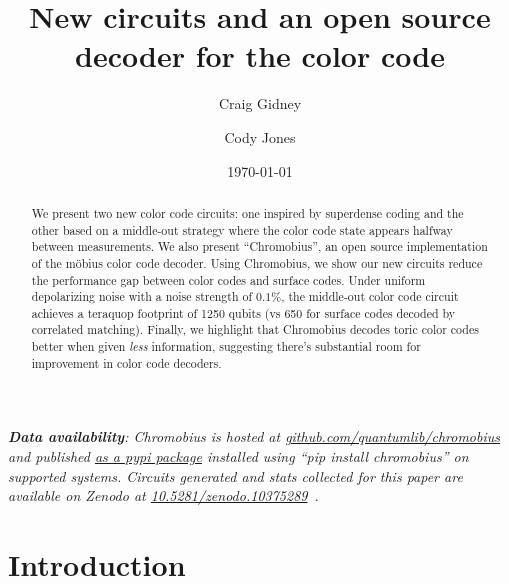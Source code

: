 \documentclass[onecolumn,unpublished,a4paper]{quantumarticle}
\theoremstyle{definition}
\theoremstyle{definition}
\theoremstyle{definition}
\begin{document}
\title{New circuits and an open source decoder for the color code}

\date{\today}

\author{Craig Gidney}

\author{Cody Jones}

\begin{abstract}
We present two new color code circuits: one inspired by superdense coding and the other based on a middle-out strategy where the color code state appears halfway between measurements.
We also present ``Chromobius'', an open source implementation of the m{\"o}bius color code decoder.
Using Chromobius, we show our new circuits reduce the performance gap between color codes and surface codes.
Under uniform depolarizing noise with a noise strength of $0.1\%$, the middle-out color code circuit achieves a teraquop footprint of 1250 qubits (vs 650 for surface codes decoded by correlated matching).
Finally, we highlight that Chromobius decodes toric color codes better when given \emph{less} information, suggesting there's substantial room for improvement in color code decoders.
\end{abstract}

\emph{
\textbf{Data availability}:
Chromobius is hosted at \href{https://github.com/quantumlib/chromobius/}{github.com/quantumlib/chromobius} and published \href{https://pypi.org/project/chromobius}{as a pypi package} installed using ``pip install chromobius'' on supported systems.
Circuits generated and stats collected for this paper are available on Zenodo at \href{https://doi.org/10.5281/zenodo.10375289}{10.5281/zenodo.10375289}~\cite{gidney2023colorcodedata}.
}

\tableofcontents
\clearpage

\section{Introduction}

\label{sec:introduction}
\end{document}
